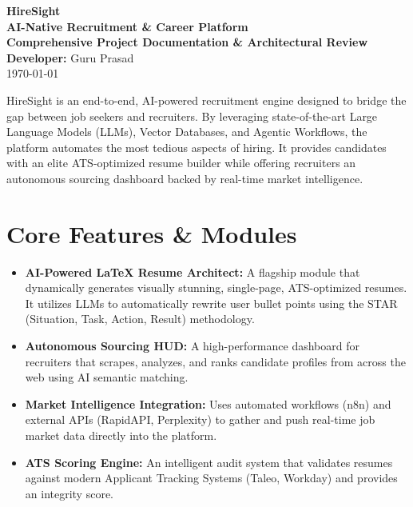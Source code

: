 \documentclass[12pt, a4paper]{article}
\begin{document}
\begin{center}
    {\Huge \textbf{HireSight}}\\[0.5cm]
    {\LARGE \textbf{AI-Native Recruitment \& Career Platform}}\\[1cm]
    {\large \textbf{Comprehensive Project Documentation \& Architectural Review}}\\[0.5cm]
    {\large \textbf{Developer:} Guru Prasad}\\[0.2cm]
    {\large \today}
\end{center}

\vspace{1cm}

\begin{tcolorbox}[colback=primary!5,colframe=primary,title=\textbf{1. Executive Summary}]
HireSight is an end-to-end, AI-powered recruitment engine designed to bridge the gap between job seekers and recruiters. By leveraging state-of-the-art Large Language Models (LLMs), Vector Databases, and Agentic Workflows, the platform automates the most tedious aspects of hiring. It provides candidates with an elite ATS-optimized resume builder while offering recruiters an autonomous sourcing dashboard backed by real-time market intelligence.
\end{tcolorbox}

\section{Core Features \& Modules}

\begin{itemize}
    \item \textbf{AI-Powered LaTeX Resume Architect:} A flagship module that dynamically generates visually stunning, single-page, ATS-optimized resumes. It utilizes LLMs to automatically rewrite user bullet points using the STAR (Situation, Task, Action, Result) methodology.
    \item \textbf{Autonomous Sourcing HUD:} A high-performance dashboard for recruiters that scrapes, analyzes, and ranks candidate profiles from across the web using AI semantic matching.
    \item \textbf{Market Intelligence Integration:} Uses automated workflows (n8n) and external APIs (RapidAPI, Perplexity) to gather and push real-time job market data directly into the platform.
    \item \textbf{ATS Scoring Engine:} An intelligent audit system that validates resumes against modern Applicant Tracking Systems (Taleo, Workday) and provides an integrity score.
\end{itemize}
\end{document}
